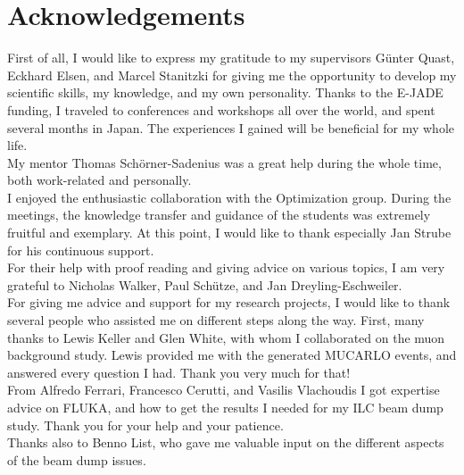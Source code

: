 \chapter*{Acknowledgements}

First of all, I would like to express my gratitude to my supervisors G\"unter Quast, Eckhard Elsen, and Marcel Stanitzki for giving me the opportunity to develop my scientific skills, my knowledge, and my own personality.
Thanks to the E-JADE funding, I traveled to conferences and workshops all over the world, and spent several months in Japan.
The experiences I gained will be beneficial for my whole life.
\vspace*{0.2cm}\\
\noindent My mentor Thomas Sch\"orner-Sadenius was a great help during the whole time, both work-related and personally.
\vspace*{0.2cm}\\
\noindent I enjoyed the enthusiastic collaboration with the \sid Optimization group.
During the meetings, the knowledge transfer and guidance of the students was extremely fruitful and exemplary.
At this point, I would like to thank especially Jan Strube for his continuous support.
\vspace*{0.2cm}\\
\noindent For their help with proof reading and giving advice on various topics, I am very grateful to Nicholas Walker, Paul Sch\"utze, and Jan Dreyling-Eschweiler.
\vspace*{0.2cm}\\
\noindent For giving me advice and support for my research projects, I would like to thank several people who assisted me on different steps along the way.
First, many thanks to Lewis Keller and Glen White, with whom I collaborated on the muon background study.
Lewis provided me with the generated MUCARLO events, and answered every question I had.
Thank you very much for that!
\vspace*{0.2cm}\\
\noindent From Alfredo Ferrari, Francesco Cerutti, and Vasilis Vlachoudis I got expertise advice on FLUKA, and how to get the results I needed for my ILC beam dump study.
Thank you for your help and your patience.
\\Thanks also to Benno List, who gave me valuable input on the different aspects of the beam dump issues.
